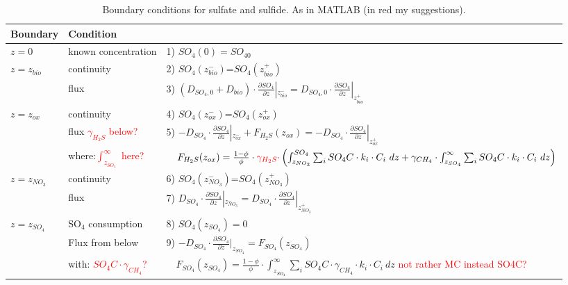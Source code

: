 \documentclass[gmd, manuscript]{copernicus}
\begin{document}
\begin{table}[tbp]
\caption{Boundary conditions for sulfate and sulfide. As in MATLAB (in red my suggestions).}
\centering
\begin{tabular}{ |l| l| l|}
\hline
\textbf{Boundary}& \textbf{Condition}&\\
\hline
$z=0$& known concentration& 1) $SO_4(0)=SO_{40}$  \\
$z=z_{bio}$&continuity& 2) $SO_4(z_{bio}^-)$=$SO_4(z_{bio}^+)$\\
               & flux & 3) $\left(D_{SO_4,0}+D_{bio}\right )\cdot \frac{\partial SO_4}{\partial z}|_{z_{bio}^-}=D_{SO_4,0} \cdot \frac{\partial SO_4}{\partial z}|_{z_{bio}^+}$\\
$z=z_{ox}$& continuity& 4) $SO_4(z_{ox}^-)$=$SO_4(z_{ox}^+)$\\
               & flux \textcolor{red}{$\gamma_{H_2S}$ below?} & 5) $-D_{SO_4} \cdot \frac{\partial SO_4}{\partial z}|_{z_{ox}^-} +  F_{H_2S}(z_{ox})=-D_{SO_4} \cdot \frac{\partial SO_4}{\partial z}|_{z_{ox}^+}$\\
&where:\textcolor{red}{$\int_{z_{SO_4}}^{\infty}$ here?} & $\quad F_{H_2S}(z_{ox})=\frac{1-\phi}{\phi} \cdot \textcolor{red}{\gamma_{H_2S}\cdot} \left( \int_{z_{NO_3}}^{SO_4}  \sum_i SO_4C \cdot k_i \cdot C_i\ dz + \gamma_{CH_4}\cdot \int_{z_{SO_4}}^{\infty}  \sum_i SO_4C \cdot k_i \cdot C_i\ dz \right)$\\          
$z=z_{NO_3}$&continuity& 6) $SO_4(z_{NO_3}^-)$=$SO_4(z_{NO_3}^+)$\\
               & flux & 7) $D_{SO_4}\cdot \frac{\partial SO_4}{\partial z}|_{z_{NO_3}^-}=D_{SO_4} \cdot \frac{\partial SO_4}{\partial z}|_{z_{NO_3}^+}$\\
$z=z_{SO_4}$& SO$_4$ consumption & 8) $SO_4(z_{SO_4})=0$ \\%
& Flux from below& 9) $-D_{SO_4} \cdot \frac{\partial SO_4}{\partial z}|_{z_{SO_4}}= F_{SO_4}(z_{SO_4})$\\   
&with:\textcolor{red}{ $SO_4C \cdot \gamma_{CH_4}$?}&$ \quad F_{SO_4}(z_{SO_4})=\frac{1-\phi}{\phi} \cdot \int_{z_{SO_4}}^{\infty}  \sum_i SO_4C \cdot \gamma_{CH_4} \cdot k_i \cdot C_i\ dz$ \textcolor{red}{not rather MC instead SO4C?}\\

\end{tabular}
\end{table}
\end{document}
